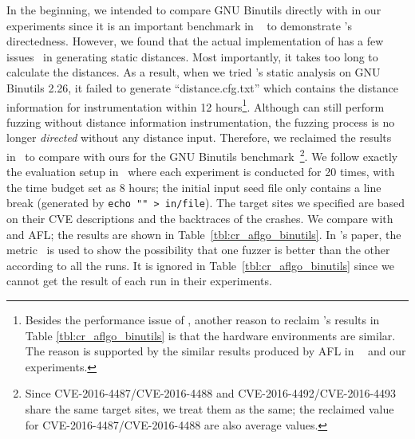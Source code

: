In the beginning, we intended to compare GNU Binutils directly with {\aflgo} in our experiments since it is an important benchmark in ~\cite{Bohme:2017:DGF} to demonstrate {\aflgo}'s directedness. However, we found that the actual implementation of {\aflgo} has a few issues~\cite{aflgo_issues} in generating static distances. Most importantly, it takes too long to calculate the distances. As a result, when we tried {\aflgo}'s static analysis on GNU Binutils 2.26, it failed to generate ``distance.cfg.txt'' which contains the distance information for instrumentation within 12 hours\footnote{{Besides the performance issue of \aflgo, another reason to reclaim \aflgo's results in Table \ref{tbl:cr_aflgo_binutils} is that the hardware environments are similar. The reason is supported by the similar results produced by AFL in \textbf{~\cite{Bohme:2017:DGF}} and our experiments.}}. Although {\aflgo} can still perform fuzzing without distance information instrumentation, the fuzzing process is no longer \emph{directed} without any distance input.
Therefore, we reclaimed the results in~\cite{Bohme:2017:DGF} to compare with ours for the GNU Binutils benchmark~\footnote{Since CVE-2016-4487/CVE-2016-4488 and CVE-2016-4492/CVE-2016-4493 share the same target sites, we treat them as the same; the reclaimed value for CVE-2016-4487/CVE-2016-4488 are also average values.}. We follow exactly the evaluation setup in~\cite{Bohme:2017:DGF} where each experiment is conducted for 20 times, with the time budget set as 8 hours; the initial input seed file only contains a line break (generated by \verb|echo "" > in/file|). The target sites we specified are based on their CVE descriptions and the backtraces of the crashes. We compare {\dFOT} with {\aflgo} and AFL; the results are shown in Table~\ref{tbl:cr_aflgo_binutils}. In {\aflgo}'s paper, the {\alz} metric~\cite{alz_metric} is used to show the possibility that one fuzzer is better than the other according to all the runs. It is ignored in Table~\ref{tbl:cr_aflgo_binutils} since we cannot get the result of each run in their experiments.

